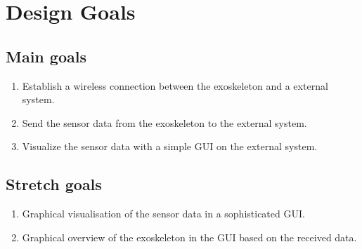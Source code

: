 \section{Design Goals}
\subsection{Main goals}
\begin{enumerate}
	\item Establish a wireless connection between the exoskeleton and a external system.
	\item Send the sensor data from the exoskeleton to the external system.
	\item Visualize the sensor data with a simple GUI on the external system.
\end{enumerate}

\subsection{Stretch goals}
\begin{enumerate}
	\item Graphical visualisation of the sensor data in a sophisticated GUI. 
	\item Graphical overview of the exoskeleton in the GUI based on the received data.
\end{enumerate}